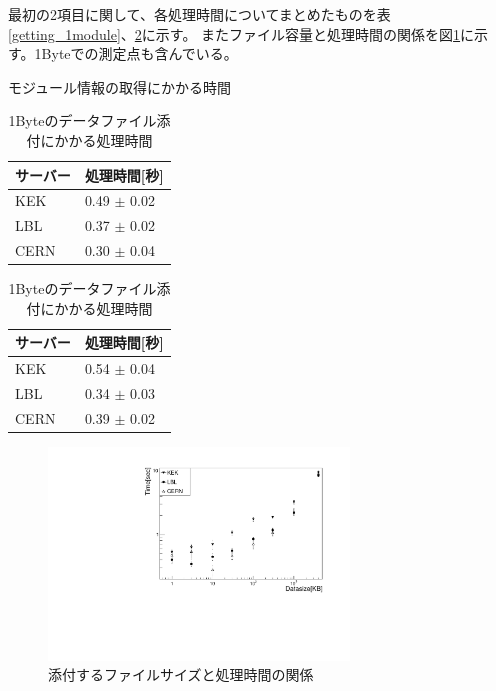 最初の2項目に関して、各処理時間についてまとめたものを表\ref{getting_1module}、\ref{sendpd_1byte}に示す。
またファイル容量と処理時間の関係を図\ref{datasize_vs_time}に示す。1Byteでの測定点も含んでいる。

\begin{table}[tbp]
  \begin{minipage}[t]{.45\textwidth}
  \begin{center}
  \caption[モジュール情報の取得にかかる時間]{モジュール情報の取得にかかる時間}
  \label{getting_1module}
    \begin{tabular}{|ll|} \hline
      サーバー & 処理時間[秒] \\ \hline
      KEK & 0.49 $\pm$ 0.02 \\ 
      LBL & 0.37 $\pm$ 0.02 \\ 
      CERN & 0.30 $\pm$ 0.04 \\ \hline 
    \end{tabular}
  \end{center}
  \end{minipage}
  \hfill 
  \begin{minipage}[t]{.45\textwidth}
  \begin{center}
  \caption[1Byteのデータファイル添付にかかる処理時間]{1Byteのデータファイル添付にかかる処理時間}
  \label{sendpd_1byte}
    \begin{tabular}{|ll|} \hline
      サーバー & 処理時間[秒] \\ \hline
      KEK & 0.54 $\pm$ 0.04 \\ 
      LBL & 0.34 $\pm$ 0.03 \\ 
      CERN & 0.39 $\pm$ 0.02 \\ \hline 
    \end{tabular}
  \end{center}
  \end{minipage}
\end{table}

\begin{figure}[bpt]\centering
  \begin{center}
    \includegraphics[width=8cm,angle=270]{datasize_vs_time_new.pdf}
  \caption[添付するファイルサイズと処理時間の関係]{添付するファイルサイズと処理時間の関係}
  \label{datasize_vs_time}
  \end{center}

\end{figure}

